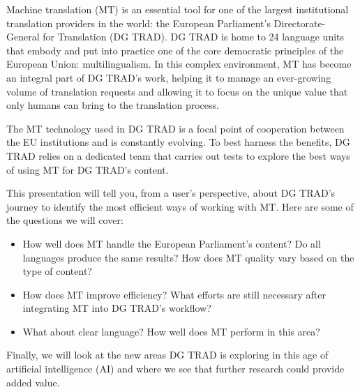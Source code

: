 Machine translation (MT) is an essential tool for one of the largest institutional translation providers in the world: the European Parliament’s Directorate-General for Translation (DG TRAD). DG TRAD is home to 24 language units that embody and put into practice one of the core democratic principles of the European Union: multilingualism. In this complex environment, MT has become an integral part of DG TRAD’s work, helping it to manage an ever-growing volume of translation requests and allowing it to focus on the unique value that only humans can bring to the translation process. 

The MT technology used in DG TRAD is a focal point of cooperation between the EU institutions and is constantly evolving. To best harness the benefits, DG TRAD relies on a dedicated team that carries out tests to explore the best ways of using MT for DG TRAD’s content. 

This presentation will tell you, from a user’s perspective, about DG TRAD’s journey to identify the most efficient ways of working with MT. Here are some of the questions we will cover:

\begin{itemize}
\item How well does MT handle the European Parliament’s content? Do all languages produce the same results? How does MT quality vary based on the type of content?
\item How does MT improve efficiency? What efforts are still necessary after integrating MT into DG TRAD’s workflow?
\item What about clear language? How well does MT perform in this area?
\end{itemize}

Finally, we will look at the new areas DG TRAD is exploring in this age of artificial intelligence (AI) and where we see that further research could provide added value.
